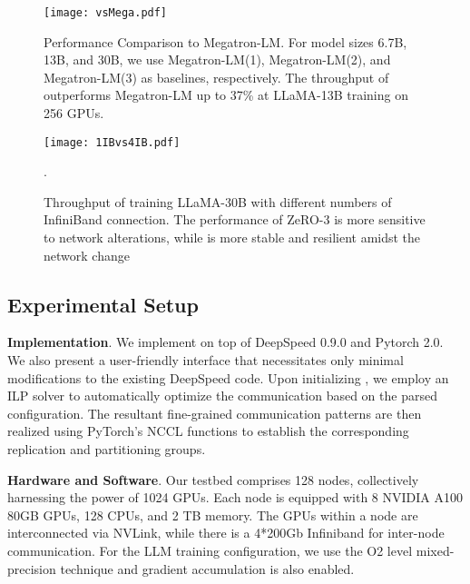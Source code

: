 \begin{figure}[t]
    \centering
    \texttt{[image: vsMega.pdf]}
    \caption{Performance Comparison to Megatron-LM. For model sizes 6.7B, 13B, and 30B, we use Megatron-LM(1), Megatron-LM(2), and Megatron-LM(3) as baselines, respectively. The throughput of \SysName outperforms Megatron-LM up to 37\% at LLaMA-13B training on 256 GPUs.}
    \label{megatron}
\end{figure}


\begin{figure}[t]
    \centering
    \texttt{[image: 1IBvs4IB.pdf]}
    \caption{Throughput of training LLaMA-30B with different numbers of InfiniBand connection. The performance of ZeRO-3 is more sensitive to network alterations, while \SysName is more stable and resilient amidst the network change}.
    \label{1IB}
\end{figure}

\subsection{Experimental Setup}
\textbf{Implementation}. We implement \SysName on top of DeepSpeed 0.9.0 and Pytorch 2.0.
We also present a user-friendly interface that necessitates only minimal modifications to the existing DeepSpeed code. 
Upon initializing \SysName, we employ an ILP solver to automatically optimize the communication based on the parsed configuration. The resultant fine-grained communication patterns are then realized using PyTorch's NCCL functions to establish the corresponding replication and partitioning groups. 


\textbf{Hardware and Software}. Our testbed comprises 128 nodes, collectively harnessing the power of 1024 GPUs. Each node is equipped with 8 NVIDIA A100 80GB GPUs, 128 CPUs, and 2 TB memory. The GPUs within a node are interconnected via NVLink, while there is a 4*200Gb Infiniband for inter-node communication. For the LLM training configuration, we use the O2 level mixed-precision technique \cite{ApexMixedPrecision} and gradient accumulation is also enabled.




